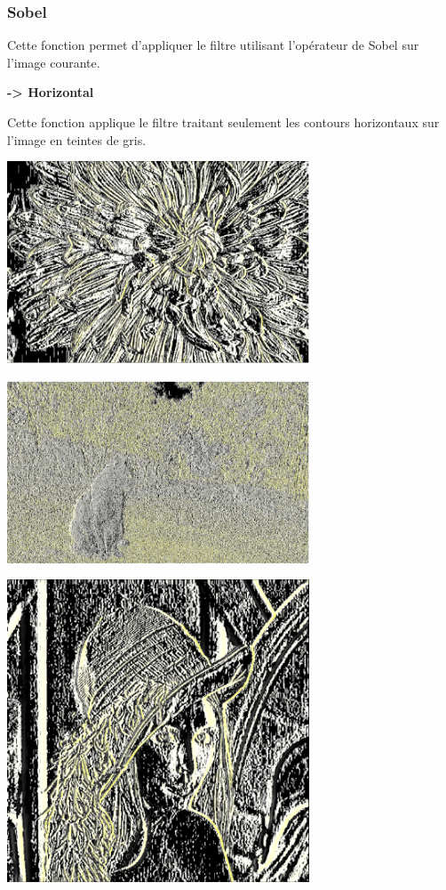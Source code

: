 \documentclass{article}
\begin{document}
\subsubsection{Sobel}
Cette fonction permet d'appliquer le filtre utilisant l'opérateur de Sobel sur l'image courante.

\bigbreak
\textbf{-> Horizontal}

Cette fonction applique le filtre traitant seulement les contours horizontaux sur l'image en teintes de gris.

\begin{center} 
    \includegraphics[width=9cm]{../Image_fonctions/Multicolor/SobelH.PNG}
\end{center}
\begin{center} 
    \includegraphics[width=9cm]{../Image_fonctions/Cat/SobelH.PNG}
\end{center}
\begin{center} 
    \includegraphics[width=9cm]{../Image_fonctions/Lenna/SobelH.PNG}
\end{center}
\end{document}
